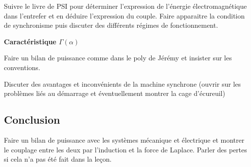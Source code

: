 Suivre le livre de PSI pour déterminer l'expression de l'énergie électromagnétique dans l'entrefer et en déduire l'expression du couple.
Faire apparaitre la condition de synchronisme puis discuter des différents régimes de fonctionnement. 

\begin{slide}
\textbf{Caractéristique $\Gamma(\alpha)$}
\end{slide}

Faire un bilan de puissance comme dans le poly de Jérémy et insister sur les conventions.

Discuter des avantages et inconvénients de la machine synchrone (ouvrir sur les problèmes liés au démarrage et éventuellement montrer la cage d'écureuil)

\subsection*{Conclusion}

Faire un bilan de puissance avec les systèmes mécanique et électrique et montrer le couplage entre les deux par l'induction et la force de Laplace.
Parler des pertes si cela n'a pas été fait dans la leçon.

\newpage